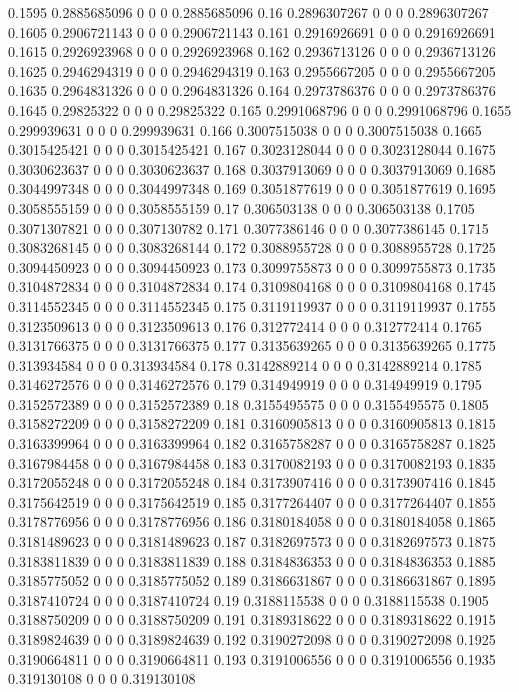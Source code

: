 {0.1595 0.2885685096 0 0 0 0.2885685096
0.16 0.2896307267 0 0 0 0.2896307267
0.1605 0.2906721143 0 0 0 0.2906721143
0.161 0.2916926691 0 0 0 0.2916926691
0.1615 0.2926923968 0 0 0 0.2926923968
0.162 0.2936713126 0 0 0 0.2936713126
0.1625 0.2946294319 0 0 0 0.2946294319
0.163 0.2955667205 0 0 0 0.2955667205
0.1635 0.2964831326 0 0 0 0.2964831326
0.164 0.2973786376 0 0 0 0.2973786376
0.1645 0.29825322 0 0 0 0.29825322
0.165 0.2991068796 0 0 0 0.2991068796
0.1655 0.299939631 0 0 0 0.299939631
0.166 0.3007515038 0 0 0 0.3007515038
0.1665 0.3015425421 0 0 0 0.3015425421
0.167 0.3023128044 0 0 0 0.3023128044
0.1675 0.3030623637 0 0 0 0.3030623637
0.168 0.3037913069 0 0 0 0.3037913069
0.1685 0.3044997348 0 0 0 0.3044997348
0.169 0.3051877619 0 0 0 0.3051877619
0.1695 0.3058555159 0 0 0 0.3058555159
0.17 0.306503138 0 0 0 0.306503138
0.1705 0.3071307821 0 0 0 0.307130782
0.171 0.3077386146 0 0 0 0.3077386145
0.1715 0.3083268145 0 0 0 0.3083268144
0.172 0.3088955728 0 0 0 0.3088955728
0.1725 0.3094450923 0 0 0 0.3094450923
0.173 0.3099755873 0 0 0 0.3099755873
0.1735 0.3104872834 0 0 0 0.3104872834
0.174 0.3109804168 0 0 0 0.3109804168
0.1745 0.3114552345 0 0 0 0.3114552345
0.175 0.3119119937 0 0 0 0.3119119937
0.1755 0.3123509613 0 0 0 0.3123509613
0.176 0.312772414 0 0 0 0.312772414
0.1765 0.3131766375 0 0 0 0.3131766375
0.177 0.3135639265 0 0 0 0.3135639265
0.1775 0.313934584 0 0 0 0.313934584
0.178 0.3142889214 0 0 0 0.3142889214
0.1785 0.3146272576 0 0 0 0.3146272576
0.179 0.314949919 0 0 0 0.314949919
0.1795 0.3152572389 0 0 0 0.3152572389
0.18 0.3155495575 0 0 0 0.3155495575
0.1805 0.3158272209 0 0 0 0.3158272209
0.181 0.3160905813 0 0 0 0.3160905813
0.1815 0.3163399964 0 0 0 0.3163399964
0.182 0.3165758287 0 0 0 0.3165758287
0.1825 0.3167984458 0 0 0 0.3167984458
0.183 0.3170082193 0 0 0 0.3170082193
0.1835 0.3172055248 0 0 0 0.3172055248
0.184 0.3173907416 0 0 0 0.3173907416
0.1845 0.3175642519 0 0 0 0.3175642519
0.185 0.3177264407 0 0 0 0.3177264407
0.1855 0.3178776956 0 0 0 0.3178776956
0.186 0.3180184058 0 0 0 0.3180184058
0.1865 0.3181489623 0 0 0 0.3181489623
0.187 0.3182697573 0 0 0 0.3182697573
0.1875 0.3183811839 0 0 0 0.3183811839
0.188 0.3184836353 0 0 0 0.3184836353
0.1885 0.3185775052 0 0 0 0.3185775052
0.189 0.3186631867 0 0 0 0.3186631867
0.1895 0.3187410724 0 0 0 0.3187410724
0.19 0.3188115538 0 0 0 0.3188115538
0.1905 0.3188750209 0 0 0 0.3188750209
0.191 0.3189318622 0 0 0 0.3189318622
0.1915 0.3189824639 0 0 0 0.3189824639
0.192 0.3190272098 0 0 0 0.3190272098
0.1925 0.3190664811 0 0 0 0.3190664811
0.193 0.3191006556 0 0 0 0.3191006556
0.1935 0.319130108 0 0 0 0.319130108
}
